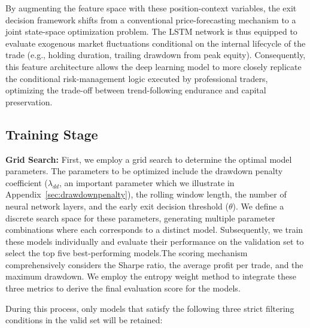 \documentclass[12pt]{article}
\begin{document}
By augmenting the feature space with these position-context variables, the exit decision framework shifts from a conventional price-forecasting mechanism to a joint state-space optimization problem. The LSTM network is thus equipped to evaluate exogenous market fluctuations conditional on the internal lifecycle of the trade (e.g., holding duration, trailing drawdown from peak equity). Consequently, this feature architecture allows the deep learning model to more closely replicate the conditional risk-management logic executed by professional traders, optimizing the trade-off between trend-following endurance and capital preservation.

\subsection{Training Stage}\label{subsec:training_stage}

\textbf{Grid Search:} First, we employ a grid search to determine the optimal model parameters. The parameters to be optimized include the drawdown penalty coefficient ($\lambda_{dd}$, an important parameter which we illustrate in Appendix~\ref{sec:drawdownpenalty}), the rolling window length, the number of neural network layers, and the early exit decision threshold ($\theta$). We define a discrete search space for these parameters, generating multiple parameter combinations where each corresponds to a distinct model. Subsequently, we train these models individually and evaluate their performance on the validation set to select the top five best-performing models.The scoring mechanism comprehensively considers the Sharpe ratio, the average profit per trade, and the maximum drawdown. We employ the entropy weight method to integrate these three metrics to derive the final evaluation score for the models.

During this process, only models that satisfy the following three strict filtering conditions in the valid set will be retained:
\end{document}
